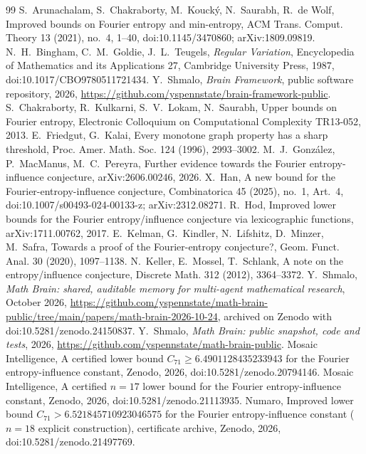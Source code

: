 \documentclass[11pt]{amsart}
\theoremstyle{definition}
\theoremstyle{remark}
\begin{document}
\begin{thebibliography}{99}
 S.~Arunachalam, S.~Chakraborty, M.~Kouck\'y, N.~Saurabh, R.~de Wolf, Improved bounds on Fourier
entropy and min-entropy, ACM Trans. Comput. Theory 13 (2021), no.~4, 1--40, doi:10.1145/3470860; arXiv:1809.09819.
 N.~H.~Bingham, C.~M.~Goldie, J.~L.~Teugels, \emph{Regular Variation}, Encyclopedia of Mathematics and
its Applications 27, Cambridge University Press, 1987, doi:10.1017/CBO9780511721434.
 Y.~Shmalo, \emph{Brain Framework}, public software repository, 2026,
\url{https://github.com/yspennstate/brain-framework-public}.
 S.~Chakraborty, R.~Kulkarni, S.~V.~Lokam, N.~Saurabh, Upper bounds on Fourier entropy,
Electronic Colloquium on Computational Complexity TR13-052, 2013.
 E.~Friedgut, G.~Kalai, Every monotone graph property has a sharp threshold, Proc. Amer. Math. Soc. 124
(1996), 2993--3002.
 M.~J.~Gonz\'alez, P.~MacManus, M.~C.~Pereyra, Further evidence towards the Fourier entropy-influence
conjecture, arXiv:2606.00246, 2026.
 X.~Han, A new bound for the Fourier-entropy-influence conjecture, Combinatorica 45 (2025), no.~1,
Art.~4, doi:10.1007/s00493-024-00133-z; arXiv:2312.08271.
 R.~Hod, Improved lower bounds for the Fourier entropy/influence conjecture via lexicographic functions,
arXiv:1711.00762, 2017.
 E.~Kelman, G.~Kindler, N.~Lifshitz, D.~Minzer, M.~Safra, Towards a proof of the
Fourier-entropy conjecture?, Geom. Funct. Anal. 30 (2020), 1097--1138.
 N.~Keller, E.~Mossel, T.~Schlank, A note on the entropy/influence conjecture, Discrete Math. 312
(2012), 3364--3372.
 Y.~Shmalo, \emph{Math Brain: shared, auditable memory for multi-agent mathematical research},
October 2026, \url{https://github.com/yspennstate/math-brain-public/tree/main/papers/math-brain-2026-10-24}, archived on Zenodo with doi:10.5281/zenodo.24150837.
 Y.~Shmalo, \emph{Math Brain: public snapshot, code and tests}, 2026,
\url{https://github.com/yspennstate/math-brain-public}.
 Mosaic Intelligence, A certified lower bound $C_{71}\ge 6.4901128435233943$ for the Fourier entropy-influence constant, Zenodo, 2026, doi:10.5281/zenodo.20794146.
 Mosaic Intelligence, A certified $n=17$ lower bound for the Fourier entropy-influence constant, Zenodo, 2026, doi:10.5281/zenodo.21113935.
 Numaro, Improved lower bound $C_{71}>6.521845710923046575$ for the Fourier entropy-influence constant ($n=18$ explicit construction), certificate archive, Zenodo, 2026, doi:10.5281/zenodo.21497769.

\end{thebibliography}
\end{document}

